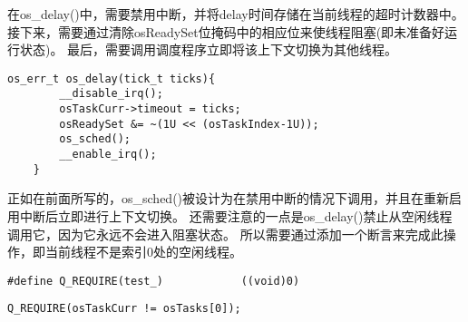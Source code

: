 在os\_delay()中，需要禁用中断，并将delay时间存储在当前线程的超时计数器中。
接下来，需要通过清除osReadySet位掩码中的相应位来使线程阻塞(即未准备好运行状态)。
最后，需要调用调度程序立即将该上下文切换为其他线程。
\begin{lstlisting}[language={[ANSI]C},keywordstyle=\color{blue!70},commentstyle=\color{red!50!green!50!blue!50},frame=shadowbox, rulesepcolor=\color{red!20!green!20!blue!20}]
    os_err_t os_delay(tick_t ticks){
        __disable_irq();
        osTaskCurr->timeout = ticks;
        osReadySet &= ~(1U << (osTaskIndex-1U));
        os_sched();
        __enable_irq();
    }
\end{lstlisting}

正如在前面所写的，os\_sched()被设计为在禁用中断的情况下调用，并且在重新启用中断后立即进行上下文切换。
还需要注意的一点是os\_delay()禁止从空闲线程调用它，因为它永远不会进入阻塞状态。
所以需要通过添加一个断言来完成此操作，即当前线程不是索引0处的空闲线程。
\begin{lstlisting}[language={[ANSI]C},keywordstyle=\color{blue!70},commentstyle=\color{red!50!green!50!blue!50},frame=shadowbox, rulesepcolor=\color{red!20!green!20!blue!20}]
    #define Q_REQUIRE(test_)            ((void)0)
\end{lstlisting}
\begin{lstlisting}[language={[ANSI]C},keywordstyle=\color{blue!70},commentstyle=\color{red!50!green!50!blue!50},frame=shadowbox, rulesepcolor=\color{red!20!green!20!blue!20}]
    Q_REQUIRE(osTaskCurr != osTasks[0]);
\end{lstlisting}

